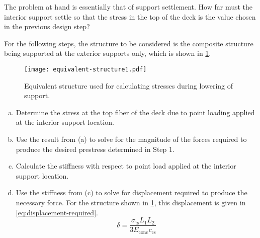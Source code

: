 The problem at hand is essentially that of support settlement. How far must the interior support settle so that the stress in the top of the deck is the value chosen in the previous design step?

For the following steps, the structure to be considered is the composite structure being supported at the exterior supports only, which is shown in \cref{fig:equivalent-structure1}.

\begin{figure}
  \texttt{[image: equivalent-structure1.pdf]}
  \caption{Equivalent structure used for calculating stresses during lowering of support.}
  \label{fig:equivalent-structure1}
\end{figure}

\begin{enumerate}[a)]
  \item Determine the stress at the top fiber of the deck due to point loading applied at the interior support location.
  \item Use the result from (a) to solve for the magnitude of the forces required to produce the desired prestress determined in Step 1.
  \item Calculate the stiffness with respect to point load applied at the interior support location.
  \item Use the stiffness from (c) to solve for displacement required to produce the necessary force. For the
  structure shown in \cref{fig:equivalent-structure1}, this displacement is given in \cref{eq:displacement-required}.
  \begin{equation}
    \label{eq:displacement-required}
    \delta = \frac{\sigma_\text{ts}L_1L_2}{3 E_\text{conc}c_\text{cs}}
  \end{equation}
\end{enumerate}

